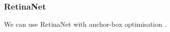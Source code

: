 

\subsubsection{RetinaNet}


We can use RetinaNet with anchor-box optimisation \cite{zlocha2019improving}.


